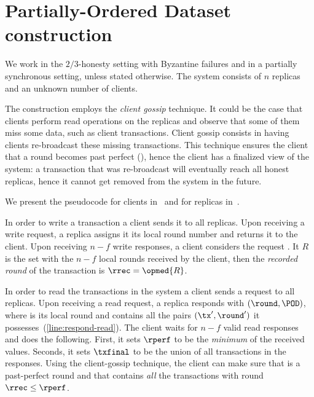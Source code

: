 
\section{Partially-Ordered Dataset construction}
We work in the $2/3$-honesty setting with Byzantine failures and in a partially synchronous setting,
unless stated otherwise. The system consists of $n$ replicas and an unknown number of clients.

The construction employs the \emph{client gossip} technique. It could be the case that
clients perform read operations on the replicas and observe that some of them miss some data, such as client transactions.
Client gossip consists in having clients re-broadcast these missing transactions.
This technique ensures the client that a round becomes past perfect (),
hence the client has a finalized view of the system: a transaction that was re-broadcast will
eventually reach all honest replicas, hence it cannot get removed from the system in the future.

We present the pseudocode for clients in~ and for replicas in~.

In order to write a transaction a client sends it to all replicas.
Upon receiving a write request, a replica assigns it its local round number \rloc and returns it to the client.
Upon receiving $n-f$ write responses, a client considers the request \emph{\recorded}.
It $R$ is the set with the $n-f$ local rounds received by the client,
then the \emph{recorded round} of the transaction is $\rrec = \opmed{R}$.

In order to read the transactions in the system a client sends a \opreadall{} request to all replicas.
Upon receiving a read request, a replica responds with $(\round, \POD)$, where \round is its local round
and \POD contains all the pairs $(\tx', \round')$ it possesses~(\cref{line:respond-read}).
The client waits for $n-f$ valid 
read responses and does the following.
First, it sets $\rperf$ to be the \emph{minimum} of the received \round values.
Seconds, it sets $\txfinal$ to be the union of all transactions in the responses.
Using the client-gossip technique, the client can make sure that \rperf is a past-perfect round and that \txfinal contains \emph{all} the transactions with \recorded round $\rrec \leq \rperf$.
\wip{}




